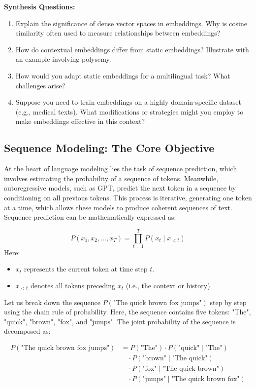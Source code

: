 \begin{questionbox}
\textbf{Synthesis Questions:}
\begin{enumerate}
    \item Explain the significance of dense vector spaces in embeddings. Why is cosine similarity often used to measure relationships between embeddings?
    \item How do contextual embeddings differ from static embeddings? Illustrate with an example involving polysemy.
    \item How would you adapt static embeddings for a multilingual task? What challenges arise?
    \item Suppose you need to train embeddings on a highly domain-specific dataset (e.g., medical texts). What modifications or strategies might you employ to make embeddings effective in this context?
\end{enumerate}
\end{questionbox}


\subsection{Sequence Modeling: The Core Objective}
    \large At the heart of language modeling lies the task of sequence prediction, which involves estimating the probability of a sequence of tokens. Meanwhile, autoregressive models, such as GPT, predict the next token in a sequence by conditioning on all previous tokens. This process is iterative, generating one token at a time, which allows these models to produce coherent sequences of text. Sequence prediction can be mathematically expressed as:
    
    \[
    P(x_1, x_2, \dots, x_T) = \prod_{t=1}^T P(x_t \mid x_{<t})
    \]
    Here:
    \begin{itemize}
        \item \(x_t\) represents the current token at time step \(t\).
        \item \(x_{<t}\) denotes all tokens preceding \(x_t\) (i.e., the context or history).
    \end{itemize}

    Let us break down the sequence \(P(\text{"The quick brown fox jumps"})\) step by step using the chain rule of probability. Here, the sequence contains five tokens: \(\text{"The"}\), \(\text{"quick"}\), \(\text{"brown"}\), \(\text{"fox"}\), and \(\text{"jumps"}\). The joint probability of the sequence is decomposed as:

    \[
    \begin{aligned}
    P(\text{"The quick brown fox jumps"}) 
    & = P(\text{"The"}) \cdot P(\text{"quick"} \mid \text{"The"}) \\
    & \quad \cdot P(\text{"brown"} \mid \text{"The quick"}) \\
    & \quad \cdot P(\text{"fox"} \mid \text{"The quick brown"}) \\
    & \quad \cdot P(\text{"jumps"} \mid \text{"The quick brown fox"})
    \end{aligned}
    \]



